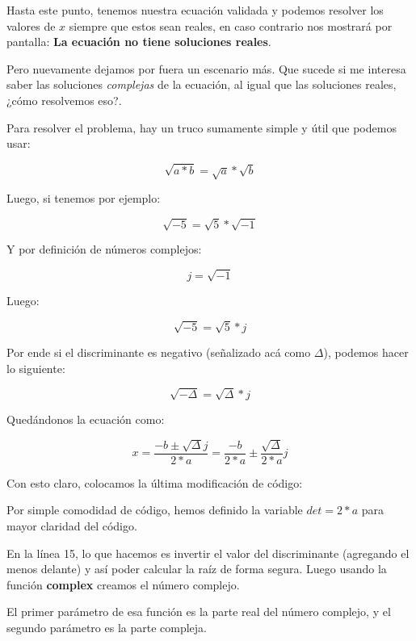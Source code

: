 \begin{enumerate}[{Ejercicio} 1.]
    Hasta este punto, tenemos nuestra ecuación validada y podemos resolver los valores de \(x\) siempre que estos sean reales, en caso contrario nos mostrará por pantalla: \textbf{La ecuación no tiene soluciones reales}.

    Pero nuevamente dejamos por fuera un escenario más. Que sucede si me interesa saber las soluciones \textit{complejas} de la ecuación, al igual que las soluciones reales, ¿cómo resolvemos eso?.

    Para resolver el problema, hay un truco sumamente simple y útil que podemos usar:

    \[ \sqrt{a * b} = \sqrt{a} * \sqrt{b} \]

    Luego, si tenemos por ejemplo:

    \[ \sqrt{-5} = \sqrt{5} * \sqrt{-1} \]

    Y por definición de números complejos:

    \[ j = \sqrt{-1} \]

    Luego:

    \[ \sqrt{-5} = \sqrt{5} * j \]

    Por ende si el discriminante es negativo (señalizado acá como \(\Delta\)), podemos hacer lo siguiente:

    \[ \sqrt{-\Delta} = \sqrt{\Delta} * j \]

    Quedándonos la ecuación como:

    \[ x = \frac{-b \pm \sqrt{\Delta}j}{2*a} = \frac{-b}{2*a} \pm \frac{\sqrt{\Delta}}{2*a}j \]

    Con esto claro, colocamos la última modificación de código:\\

    \begin{listing}[H]
    \end{listing}

    Por simple comodidad de código, hemos definido la variable \(det = 2 * a\) para mayor claridad del código.

    En la línea 15, lo que hacemos es invertir el valor del discriminante (agregando el menos delante) y así poder calcular la raíz de forma segura. Luego usando la función \textbf{complex} creamos el número complejo. 

    El primer parámetro de esa función es la parte real del número complejo, y el segundo parámetro es la parte compleja.

\end{enumerate}